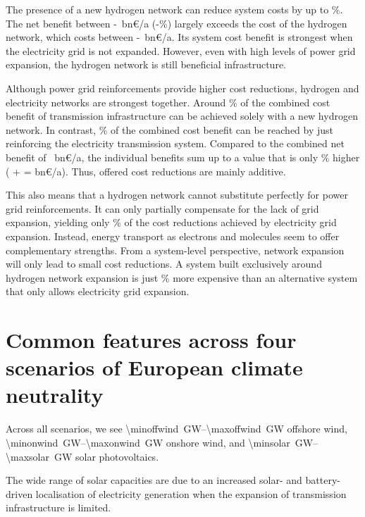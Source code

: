 The presence of a new hydrogen network can reduce system costs by up to
\maxhybenefitrel\%. The net benefit between
\minhybenefitabs-\maxhybenefitabs~bn\euro/a
(\minhybenefitrel-\maxhybenefitrel\%) largely exceeds the cost of the hydrogen
network, which costs between \minhycost-\maxhycost~bn\euro/a. Its system cost
benefit is strongest when the electricity grid is not expanded. However, even
with high levels of power grid expansion, the hydrogen network is still
beneficial infrastructure.

Although power grid reinforcements provide higher cost reductions, hydrogen and
electricity networks are strongest together. Around
\hyoftotalbenefit\% of the combined cost benefit of transmission infrastructure
can be achieved solely with a new hydrogen network. In contrast,
\acoftotalbenefit\% of the combined cost benefit can be reached by just
reinforcing the electricity transmission system. Compared to the combined net
benefit of \gridbenefitabs~bn\euro/a, the individual benefits sum up to a value
that is only \additivebenefitrel\% higher (\maxacbenefitabs{} + \maxhybenefitabs{} =
\additivebenefitabs{} bn\euro/a). Thus, offered cost reductions are mainly
additive.

This also means that a hydrogen network cannot substitute perfectly for power
grid reinforcements. It can only partially compensate for the lack of grid
expansion, yielding only \benefithyofac\% of the cost reductions achieved
by electricity grid expansion. Instead, energy transport as electrons and
molecules seem to offer complementary strengths. From a system-level
perspective, network expansion will only lead to small cost reductions.
A system built exclusively around hydrogen network expansion is just \acvshycost\%
more expensive than an alternative system that only allows electricity grid
expansion.

\section*{Common features across four scenarios of European climate neutrality}
\label{sec:es}

Across all scenarios, we see \SIrange{\minoffwind}{\maxoffwind}{\giga\watt}
offshore wind, \SIrange{\minonwind}{\maxonwind}{\giga\watt} onshore wind, and
\SIrange{\minsolar}{\maxsolar}{\giga\watt} solar photovoltaics.

The wide range
of solar capacities are due to an increased solar- and battery-driven
localisation of electricity generation when the expansion of transmission
infrastructure is limited.

